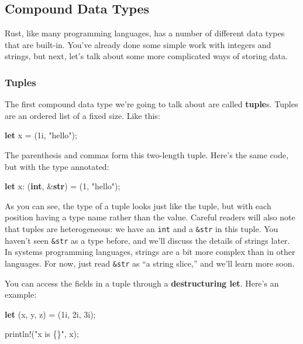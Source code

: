 \documentclass[]{article}
\newenvironment{Shaded}{}{}
\newcommand{\KeywordTok}[1]{\textcolor[rgb]{0.00,0.44,0.13}{\textbf{{#1}}}}
\newcommand{\DecValTok}[1]{\textcolor[rgb]{0.25,0.63,0.44}{{#1}}}
\newcommand{\StringTok}[1]{\textcolor[rgb]{0.25,0.44,0.63}{{#1}}}
\newcommand{\OtherTok}[1]{\textcolor[rgb]{0.00,0.44,0.13}{{#1}}}
\newcommand{\NormalTok}[1]{{#1}}
\begin{document}
\subsection{Compound Data Types}\label{compound-data-types}

Rust, like many programming languages, has a number of different data
types that are built-in. You've already done some simple work with
integers and strings, but next, let's talk about some more complicated
ways of storing data.

\subsubsection{Tuples}\label{tuples}

The first compound data type we're going to talk about are called
\textbf{tuple}s. Tuples are an ordered list of a fixed size. Like this:

\begin{Shaded}
\begin{Highlighting}[]
\KeywordTok{let} \NormalTok{x = (}\DecValTok{1i}\NormalTok{, }\StringTok{"hello"}\NormalTok{);}
\end{Highlighting}
\end{Shaded}

The parenthesis and commas form this two-length tuple. Here's the same
code, but with the type annotated:

\begin{Shaded}
\begin{Highlighting}[]
\KeywordTok{let} \NormalTok{x: (}\KeywordTok{int}\NormalTok{, &}\KeywordTok{str}\NormalTok{) = (}\DecValTok{1}\NormalTok{, }\StringTok{"hello"}\NormalTok{);}
\end{Highlighting}
\end{Shaded}

As you can see, the type of a tuple looks just like the tuple, but with
each position having a type name rather than the value. Careful readers
will also note that tuples are heterogeneous: we have an \texttt{int}
and a \texttt{\&str} in this tuple. You haven't seen \texttt{\&str} as a
type before, and we'll discuss the details of strings later. In systems
programming languages, strings are a bit more complex than in other
languages. For now, just read \texttt{\&str} as ``a string slice,'' and
we'll learn more soon.

You can access the fields in a tuple through a \textbf{destructuring
let}. Here's an example:

\begin{Shaded}
\begin{Highlighting}[]
\KeywordTok{let} \NormalTok{(x, y, z) = (}\DecValTok{1i}\NormalTok{, }\DecValTok{2i}\NormalTok{, }\DecValTok{3i}\NormalTok{);}

\OtherTok{println!}\NormalTok{(}\StringTok{"x is \{\}"}\NormalTok{, x);}
\end{Highlighting}
\end{Shaded}
\end{document}
